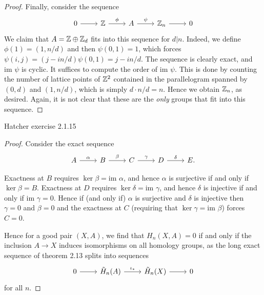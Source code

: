 \documentclass{../../mathnotes}
\begin{document}
\begin{proof}
    Finally, consider the sequence
    \begin{equation*}
        \begin{tikzcd}
            0\ar{r} & \Z\ar{r}{\phi} & A\ar{r}{\psi} & \Z_{n}\ar{r} & 0
        \end{tikzcd}
    \end{equation*}
    We claim that $A=\mathbb{Z}\oplus\mathbb{Z}_d$ fits into this sequence for $d|n$. Indeed, we define $\phi(1)=(1,n/d)$
    and then $\psi(0,1)=1$, which forces $\psi(i,j)=(j-in/d)\psi(0,1)=j-in/d$. The sequence is clearly exact,
    and $\text{im }\psi$ is cyclic. It suffices to compute the order of $\text{im }\psi$. This is done by
    counting the number of lattice points of $\mathbb{Z}^2$ contained in the parallelogram spanned by $(0,d)$ and $(1,n/d)$,
    which is simply $d\cdot n/d=n$. Hence we obtain $\mathbb{Z}_n$, as desired.
    Again, it is not clear that these are the \textit{only} groups that fit into this sequence.
\end{proof}

\begin{prop}
    Hatcher exercise 2.1.15
\end{prop}
\begin{proof}
    Consider the exact sequence
    \begin{equation*}
        \begin{tikzcd}
            A\ar{r}{\alpha}&B\ar{r}{\beta}&C\ar{r}{\gamma}&D\ar{r}{\delta}&E.
        \end{tikzcd}
    \end{equation*}

    Exactness at $B$ requires $\ker\beta=\text{im }\alpha$, and hence $\alpha$ is surjective if and only
    if $\ker\beta=B$. Exactness at $D$ requires $\ker\delta=\text{im }\gamma$, and hence $\delta$ is injective
    if and only if $\text{im }\gamma=0$.
    Hence if (and only if) $\alpha$ is surjective and $\delta$ is injective then $\gamma=0$ and $\beta=0$ and the exactness at $C$
    (requiring that $\ker\gamma=\text{im }\beta$) forces $C=0$.

    Hence for a good pair $(X,A)$, we find that $H_n(X,A)=0$ if and only if the inclusion $A\to X$ induces
    isomorphisms on all homology groups, as the long exact sequence of theorem 2.13 splits into sequences
    \begin{equation*}
        \begin{tikzcd}
            0\ar{r}&\tilde H_n(A)\ar{r}{\iota_*}&\tilde H_n(X)\ar{r}&0
        \end{tikzcd}
    \end{equation*}
    for all $n$.
\end{proof}
\end{document}
